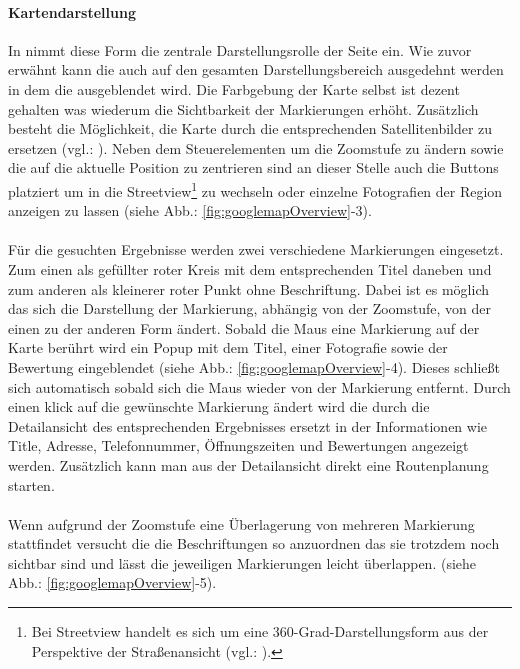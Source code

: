 \documentclass[../Bachelorarbeit.tex]{subfiles}
\begin{document}
\paragraph{Kartendarstellung}
\label{gmapsMap}
In  nimmt diese Form die zentrale Darstellungsrolle der Seite ein. 
Wie zuvor erwähnt kann die  auch auf den  gesamten Darstellungsbereich ausgedehnt werden in dem die  ausgeblendet wird.
Die Farbgebung der Karte selbst ist dezent gehalten was wiederum die Sichtbarkeit der Markierungen erhöht.
Zusätzlich besteht die Möglichkeit, die Karte durch die entsprechenden Satellitenbilder zu ersetzen (vgl.: \cite{GoogleMapsEarthView}).
Neben dem Steuerelementen um die Zoomstufe zu ändern sowie die  auf die aktuelle Position zu zentrieren sind an dieser Stelle auch die Buttons platziert um in die Streetview\footnote{
		Bei Streetview handelt es sich um eine 360-Grad-Darstellungsform aus der Perspektive der Straßenansicht (vgl.: \cite{GoogleMapsStreetview}). 
	}
zu wechseln oder einzelne Fotografien der Region anzeigen zu lassen (siehe Abb.: \ref{fig:googlemapOverview}-3).\\
\\
Für die gesuchten Ergebnisse werden zwei verschiedene Markierungen eingesetzt. 
Zum einen als gefüllter roter Kreis mit dem entsprechenden Titel daneben und zum anderen als kleinerer roter Punkt ohne Beschriftung. 
Dabei ist es möglich das sich die Darstellung der Markierung, abhängig von der Zoomstufe, von der einen zu der anderen Form ändert.
Sobald die Maus eine Markierung auf der Karte berührt wird ein Popup mit dem Titel, einer Fotografie sowie der Bewertung eingeblendet (siehe Abb.: \ref{fig:googlemapOverview}-4).
Dieses schließt sich automatisch sobald sich die Maus wieder von der Markierung entfernt. 
Durch einen klick auf die gewünschte Markierung ändert wird die  durch die Detailansicht des entsprechenden Ergebnisses ersetzt in der Informationen wie Title, Adresse, Telefonnummer, Öffnungszeiten und Bewertungen angezeigt werden.
Zusätzlich kann man aus der Detailansicht direkt eine Routenplanung starten. \\
\\
Wenn aufgrund der Zoomstufe eine Überlagerung von mehreren Markierung stattfindet versucht die  die Beschriftungen so anzuordnen das sie trotzdem noch sichtbar sind und lässt die jeweiligen Markierungen leicht überlappen.
(siehe Abb.: \ref{fig:googlemapOverview}-5).\\
\end{document}
